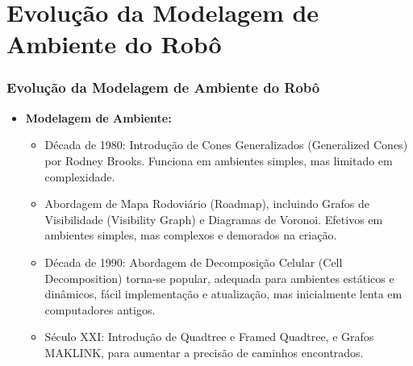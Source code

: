 \documentclass[xcolor=dvipsnames, aspectratio=169]{beamer}
\begin{document}
\section{Evolução da Modelagem de Ambiente do Robô}
\begin{frame}
  \frametitle{Evolução da Modelagem de Ambiente do Robô}
  \begin{itemize}
    \item \textbf{Modelagem de Ambiente:} 
    \begin{itemize}
        \item Década de 1980: Introdução de Cones Generalizados (Generalized Cones) por Rodney Brooks. Funciona em ambientes simples, mas limitado em complexidade.
        \item Abordagem de Mapa Rodoviário (Roadmap), incluindo Grafos de Visibilidade (Visibility Graph) e Diagramas de Voronoi. Efetivos em ambientes simples, mas complexos e demorados na criação.
        \item Década de 1990: Abordagem de Decomposição Celular (Cell Decomposition) torna-se popular, adequada para ambientes estáticos e dinâmicos, fácil implementação e atualização, mas inicialmente lenta em computadores antigos.
        \item Século XXI: Introdução de Quadtree e Framed Quadtree, e Grafos MAKLINK, para aumentar a precisão de caminhos encontrados.
    \end{itemize}
  \end{itemize}
  
\end{frame}


\end{document}
